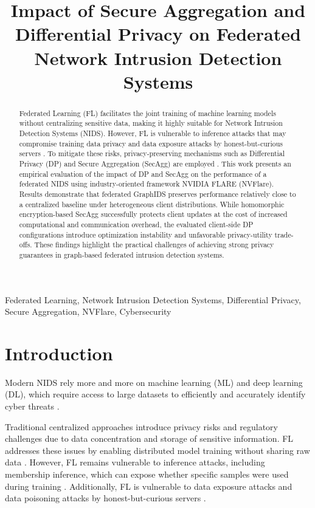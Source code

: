 \documentclass[conference]{IEEEtran}
\title{Impact of Secure Aggregation and Differential Privacy on 
Federated Network Intrusion Detection Systems}
\author{
\IEEEauthorblockN{Carlos Andrés Peña Arias}
\IEEEauthorblockA{
Department of Systems and Computing Engineering\\
Universidad de los Andes\\
Bogotá, Colombia\\
\textit{c.penaa@uniandes.edu.co}}
}
\begin{document}
\maketitle

\begin{abstract}
    Federated Learning (FL) facilitates the joint training of machine learning models without centralizing sensitive data, making it highly suitable for Network Intrusion Detection Systems (NIDS). However, FL is vulnerable to inference attacks that may compromise training data privacy and data exposure attacks by honest-but-curious servers \cite{ameria2023}. To mitigate these risks, privacy-preserving mechanisms such as Differential Privacy (DP) and Secure Aggregation (SecAgg) are employed \cite{khraisat2024}. This work presents an empirical evaluation of the impact of DP and SecAgg on the performance of a federated NIDS using  industry-oriented framework NVIDIA FLARE (NVFlare). Results demonstrate that federated GraphIDS preserves performance relatively close to a centralized baseline under heterogeneous client distributions. While homomorphic encryption-based SecAgg successfully protects client updates at the cost of increased computational and communication overhead, the evaluated client-side DP configurations introduce optimization instability and unfavorable privacy-utility trade-offs. These findings highlight the practical challenges of achieving strong privacy guarantees in graph-based federated intrusion detection systems.
\end{abstract}

\begin{IEEEkeywords}
    Federated Learning, Network Intrusion Detection Systems, Differential Privacy, Secure Aggregation, NVFlare, Cybersecurity
\end{IEEEkeywords}

\section{Introduction}

Modern NIDS rely more and more on machine learning (ML) and deep learning (DL), which require access to large datasets to efficiently and accurately identify cyber threats \cite{khraisat2024}. 

Traditional centralized approaches introduce privacy risks and regulatory challenges due to data concentration and storage of sensitive information. FL addresses these issues by enabling distributed model training without sharing raw data \cite{yurdem2024}. However, FL remains vulnerable to inference attacks, including membership inference, which can expose whether specific samples were used during training \cite{ameria2023}. Additionally, FL is vulnerable to data exposure attacks and data poisoning attacks by honest-but-curious servers \cite{he2025}.
\end{document}
